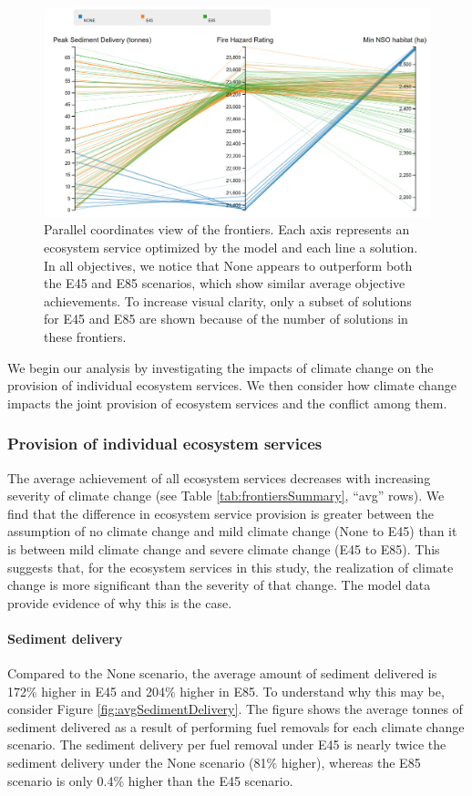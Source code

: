 \begin{figure}[ht]
\centering
\includegraphics[width=.85\textwidth]{../images/FrontiersPCPlot}
\caption[Parallel coordinates view of the three frontiers]{Parallel coordinates view of the frontiers. Each axis represents an ecosystem service optimized by the model and each line a solution. In all objectives, we notice that None appears to outperform both the E45 and E85 scenarios, which show similar average objective achievements. To increase visual clarity, only a subset of solutions for E45 and E85 are shown because of the number of solutions in these frontiers.}
\label{fig:frontiersPCPlot}
\end{figure}

We begin our analysis by investigating the impacts of climate change on the provision of individual ecosystem services. We then consider how climate change impacts the joint provision of ecosystem services and the conflict among them.

\subsubsection{Provision of individual ecosystem services}
The average achievement of all ecosystem services decreases with increasing severity of climate change (see Table \ref{tab:frontiersSummary}, ``avg'' rows). We find that the difference in ecosystem service provision is greater between the assumption of no climate change and mild climate change (None to E45) than it is between mild climate change and severe climate change (E45 to E85). This suggests that, for the ecosystem services in this study, the realization of climate change is more significant than the severity of that change. The model data provide evidence of why this is the case.

\paragraph{Sediment delivery} 
Compared to the None scenario, the average amount of sediment delivered is 172\% higher in E45 and 204\% higher in E85. To understand why this may be, consider Figure \ref{fig:avgSedimentDelivery}. The figure shows the average tonnes of sediment delivered as a result of performing fuel removals for each climate change scenario. The sediment delivery per fuel removal under E45 is nearly twice the sediment delivery under the None scenario (81\% higher), whereas the E85 scenario is only 0.4\% higher than the E45 scenario.

